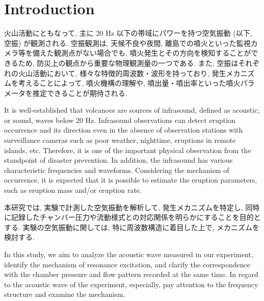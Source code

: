 \documentclass[12pt]{article}
\begin{document}
\newpage
\cleardoublepage


\section{Introduction}\label{ACOintro}

火山活動にともなって, 主に 20 Hz 以下の帯域にパワーを持つ空気振動 (以下, 空振) が観測される. 
空振観測は, 天候不良や夜間, 離島での噴火といった監視カメラ等を備えた観測点がない場合でも, 噴火発生とその方向を検知することができるため, 防災上の観点から重要な物理観測量の一つである.
また, 空振はそれぞれの火山活動において, 様々な特徴的周波数・波形を持っており, 発生メカニズムを考えることによって, 噴火機構の理解や, 噴出量・噴出率といった噴火パラメータを推定できることが期待される.


It is well-established that volcanoes are sources of infrasound, defined as acoustic, or sound, waves below 20 Hz.
Infrasound observations can detect eruption occurrence and its direction even in the absence of observation stations with surveillance cameras such as poor weather, nighttime, eruptions in remote islands, etc. 
Therefore, it is one of the important physical observation from the standpoint of disaster prevention.
In addition, the infrasound has various characteristic frequencies and waveforms. Considering the mechanism of occurrence, it is expected that it is possible to estimate the eruption parameters, such as eruption mass and/or eruption rate.



本研究では, 実験で計測した空気振動を解析して, 発生メカニズムを特定し, 同時に記録したチャンバー圧力や流動様式との対応関係を明らかにすることを目的とする. 実験の空気振動に関しては, 特に周波数構造に着目した上で, メカニズムを検討する.

In this study, we aim to analyze the acoustic wave measured in our experiment, identify the mechanism of resonance excitation, and clarify the correspondence with the chamber pressure and flow pattern recorded at the same time. In regard to the acoustic wave of the experiment, especially, pay attention to the frequency structure and examine the mechanism.
\end{document}
